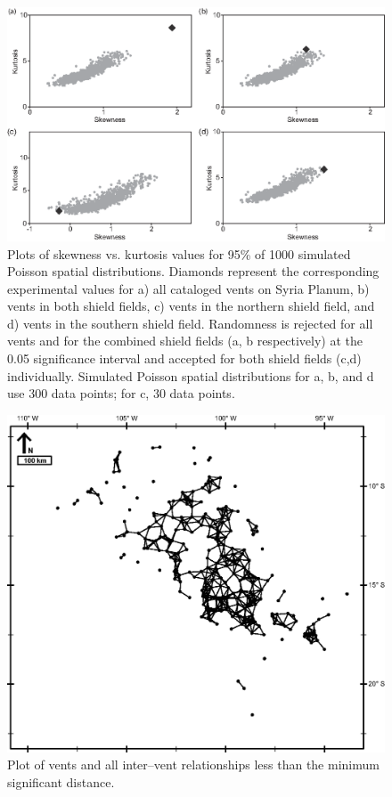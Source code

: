 \documentclass[preprint,review,authoryear,12pt]{elsarticle}
\begin{document}
\begin{figure}
\noindent\includegraphics{fig4.eps}
\caption{Plots of skewness vs. kurtosis values for 95\% of 1000 simulated Poisson spatial distributions. Diamonds represent the corresponding experimental values for a) all cataloged vents on Syria Planum, b) vents in both shield fields, c) vents in the northern shield field, and d) vents in the southern shield field. Randomness is rejected for all vents and for the combined shield fields (a, b respectively) at the 0.05 significance interval and accepted for both shield fields (c,d) individually. Simulated Poisson spatial distributions for a, b, and d use 300 data points; for c, 30 data points.}
\label{fig-skgraphs}
\end{figure}

\begin{figure}
\noindent\includegraphics{fig5.eps}
\caption{Plot of vents and all inter--vent relationships less than the minimum significant distance.}
\label{fig-azmap}
\end{figure}
\end{document}
